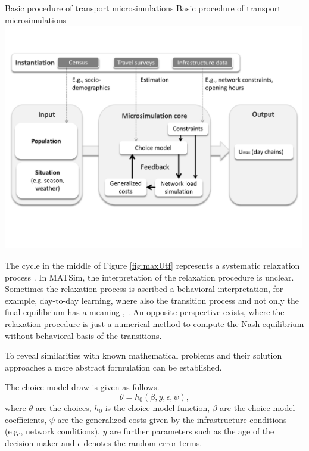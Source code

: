 \createfigure%
{Basic procedure of transport microsimulations}%
{Basic procedure of transport microsimulations}%
{\label{fig:maxUtf}}%
{\includegraphics[width=0.99\textwidth, angle=0]{understanding/figures/maxUtf.pdf}}%
{}


The cycle in the middle of Figure \ref{fig:maxUtf} represents a systematic relaxation process \citep[e.g.,][Figure 1.3]{Balmer_PhDThesis_2007}. In MATSim, the interpretation of the relaxation procedure is unclear. Sometimes the relaxation process is ascribed a behavioral interpretation, for example, day-to-day learning, where also the transition process and not only the final equilibrium has a meaning \citep[][p.128]{LiuEtAl_TransResA_2006}, \citep[][p.523]{NagelBarrett_IJMPC_1997}. An opposite perspective exists, where the relaxation procedure is just a numerical method to compute the Nash equilibrium without behavioral basis of the transitions.

To reveal similarities with known mathematical problems and their solution approaches a more abstract formulation can be established. 

The choice model draw is given as follows.
\begin{equation}
\label{eq:choiceModel}
\theta = h_0(\beta, y, \epsilon, \psi),
\end{equation}
where $\theta$ are the choices, $h_0$ is the choice model function, $\beta$ are the choice model coefficients, $\psi$ are the generalized costs given by the infrastructure conditions (e.g., network conditions), $y$ are further parameters such as the age of the decision maker and $\epsilon$ denotes the random error terms. 

